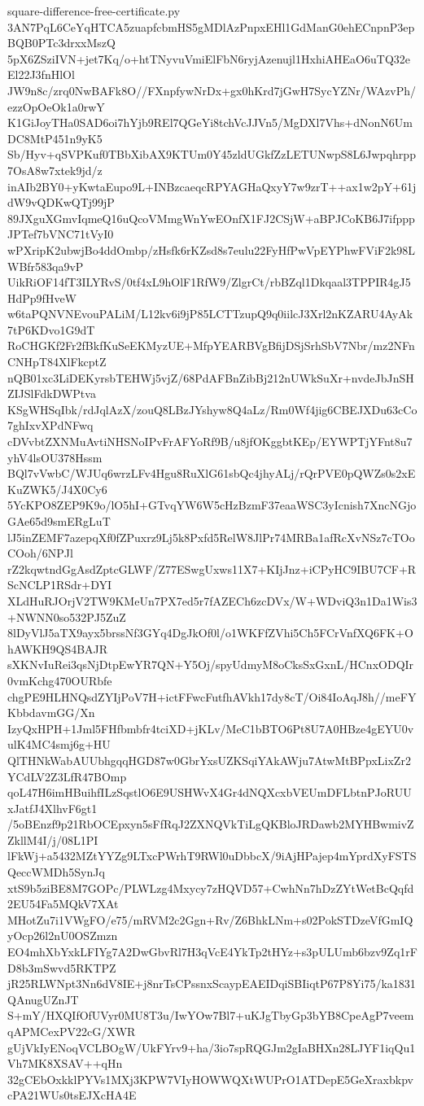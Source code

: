 \documentclass[11pt]{article}
\theoremstyle{definition}
\theoremstyle{remark}
\begin{document}
\begin{filecontents*}[overwrite]{square-difference-free-certificate.py}
3AN7PqL6CeYqHTCA5zuapfcbmHS5gMDlAzPnpxEHl1GdManG0ehECnpnP3epBQB0PTc3drxxMszQ
5pX6ZSziIVN+jet7Kq/o+htTNyvuVmiElFbN6ryjAzenujl1HxhiAHEaO6uTQ32eEl22J3fnHlOl
JW9n8c/zrq0NwBAFk8O//FXnpfywNrDx+gx0hKrd7jGwH7SycYZNr/WAzvPh/ezzOpOeOk1a0rwY
K1GiJoyTHa0SAD6oi7hYjb9REl7QGeYi8tchVcJJVn5/MgDXl7Vhs+dNonN6UmDC8MtP451n9yK5
Sb/Hyv+qSVPKuf0TBbXibAX9KTUm0Y45zldUGkfZzLETUNwpS8L6Jwpqhrpp7OsA8w7xtek9jd/z
inAIb2BY0+yKwtaEupo9L+INBzcaeqcRPYAGHaQxyY7w9zrT++ax1w2pY+61jdW9vQDKwQTj99jP
89JXguXGmvIqmeQ16uQcoVMmgWnYwEOnfX1FJ2CSjW+aBPJCoKB6J7ifpppJPTef7bVNC71tVyI0
wPXripK2ubwjBo4ddOmbp/zHsfk6rKZsd8s7eulu22FyHfPwVpEYPhwFViF2k98LWBfr583qa9vP
UikRiOF14fT3ILYRvS/0tf4xL9hOlF1RfW9/ZlgrCt/rbBZql1Dkqaal3TPPIR4gJ5HdPp9fHveW
w6taPQNVNEvouPALiM/L12kv6i9jP85LCTTzupQ9q0iilcJ3Xrl2nKZARU4AyAk7tP6KDvo1G9dT
RoCHGKf2Fr2fBkfKuSeEKMyzUE+MfpYEARBVgBfijDSjSrhSbV7Nbr/mz2NFnCNHpT84XlFkcptZ
nQB01xc3LiDEKyrsbTEHWj5vjZ/68PdAFBnZibBj212nUWkSuXr+nvdeJbJnSHZIJSlFdkDWPtva
KSgWHSqIbk/rdJqlAzX/zouQ8LBzJYshyw8Q4aLz/Rm0Wf4jig6CBEJXDu63cCo7ghIxvXPdNFwq
cDVvbtZXNMuAvtiNHSNoIPvFrAFYoRf9B/u8jfOKggbtKEp/EYWPTjYFnt8u7yhV4lsOU378Hssm
BQl7vVwbC/WJUq6wrzLFv4Hgu8RuXlG61sbQc4jhyALj/rQrPVE0pQWZs0s2xEKuZWK5/J4X0Cy6
5YcKPO8ZEP9K9o/lO5hI+GTvqYW6W5cHzBzmF37eaaWSC3yIcnish7XncNGjoGAe65d9smERgLuT
lJ5inZEMF7azepqXf0fZPuxrz9Lj5k8Pxfd5RelW8JlPr74MRBa1afRcXvNSz7cTOoCOoh/6NPJl
rZ2kqwtndGgAsdZptcGLWF/Z77ESwgUxws11X7+KIjJnz+iCPyHC9IBU7CF+RScNCLP1RSdr+DYI
XLdHuRJOrjV2TW9KMeUn7PX7ed5r7fAZECh6zcDVx/W+WDviQ3n1Da1Wis3+NWNN0so532PJ5ZuZ
8lDyVlJ5aTX9ayx5brssNf3GYq4DgJkOf0l/o1WKFfZVhi5Ch5FCrVnfXQ6FK+OhAWKH9QS4BAJR
sXKNvIuRei3qsNjDtpEwYR7QN+Y5Oj/spyUdmyM8oCksSxGxnL/HCnxODQIr0vmKchg470OURbfe
chgPE9HLHNQsdZYIjPoV7H+ictFFwcFutfhAVkh17dy8cT/Oi84IoAqJ8h//meFYKbbdavmGG/Xn
IzyQxHPH+1Jml5FHfbmbfr4tciXD+jKLv/MeC1bBTO6Pt8U7A0HBze4gEYU0vulK4MC4smj6g+HU
QlTHNkWabAUUbhgqqHGD87w0GbrYxsUZKSqiYAkAWju7AtwMtBPpxLixZr2YCdLV2Z3LfR47BOmp
qoL47H6imHBuihfILzSqstlO6E9USHWvX4Gr4dNQXcxbVEUmDFLbtnPJoRUUxJatfJ4XlhvF6gt1
/5oBEnzf9p21RbOCEpxyn5sFfRqJ2ZXNQVkTiLgQKBloJRDawb2MYHBwmivZZkllM4I/j/08L1PI
lFkWj+a5432MZtYYZg9LTxcPWrhT9RWl0uDbbcX/9iAjHPajep4mYprdXyFSTSQeccWMDh5SynJq
xtS9b5ziBE8M7GOPc/PLWLzg4Mxycy7zHQVD57+CwhNn7hDzZYtWetBcQqfd2EU54Fa5MQkV7XAt
MHotZu7i1VWgFO/e75/mRVM2c2Ggn+Rv/Z6BhkLNm+s02PokSTDzeVfGmIQyOcp26l2nU0OSZmzn
EO4mhXbYxkLFIYg7A2DwGbvRl7H3qVcE4YkTp2tHYz+s3pULUmb6bzv9Zq1rFD8b3mSwvd5RKTPZ
jR25RLWNpt3Nn6dV8IE+j8nrTsCPssnxScaypEAEIDqiSBIiqtP67P8Yi75/ka1831QAnugUZnJT
S+mY/HXQIfOfUVyr0MU8T3u/IwYOw7Bl7+uKJgTbyGp3bYB8CpeAgP7veemqAPMCexPV22cG/XWR
gUjVkIyENoqVCLBOgW/UkFYrv9+ha/3io7spRQGJm2gIaBHXn28LJYF1iqQu1Vh7MK8XSAV++qHn
32gCEbOxkklPYVs1MXj3KPW7VIyHOWWQXtWUPrO1ATDepE5GeXraxbkpvcPA21WUs0tsEJXcHA4E

\end{filecontents*}
\end{document}
